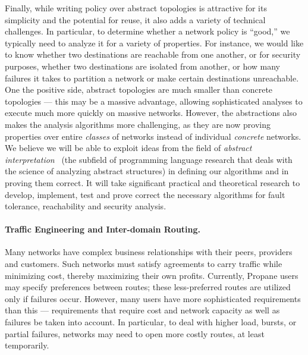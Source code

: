 Finally, while writing policy over abstract topologies is attractive
for its simplicity and the potential for reuse, it also adds a variety 
of technical challenges.  In particular, to determine whether a network
policy is ``good,'' we typically need to analyze it for a variety of
properties.  For instance, we would like to know whether two destinations
are reachable from one another, or for security purposes, whether
two destinations are isolated from another, or how many failures
it takes to partition a network or make certain destinations unreachable.
One the positive side, abstract topologies are much smaller than concrete
topologies --- this may be a massive advantage, allowing sophisticated 
analyses to execute much more quickly on massive networks.  However, the
abstractions also makes the analysis algorithms more challenging, as they
are now proving properties over entire \emph{classes} of networks instead of
individual \emph{concrete} networks.  We believe we will be able to exploit
ideas from the field of \emph{abstract interpretation}~\cite{cousot+:ai} (the subfield of
programming language research that deals with the science 
of analyzing abstract structures) in defining our algorithms and in proving
them correct.  It will take significant practical and theoretical
research to develop, implement, test and prove correct the necessary 
algorithms for fault tolerance, reachability and security analysis.

\paragraph*{Traffic Engineering and Inter-domain Routing.}
Many networks have complex business relationships with their peers, providers and 
customers.  Such networks must satisfy agreements to carry traffic while minimizing
cost, thereby maximizing their own profits.  
Currently, Propane users may specify preferences between routes; these
less-preferred routes are utilized only if failures occur.  However,
many users have more sophisticated requirements than this ---
requirements that require cost and network capacity as well as
failures be taken into account.  In particular, to deal with higher
load, bursts, or partial failures, networks may need to open more
costly routes, at least temporarily.

